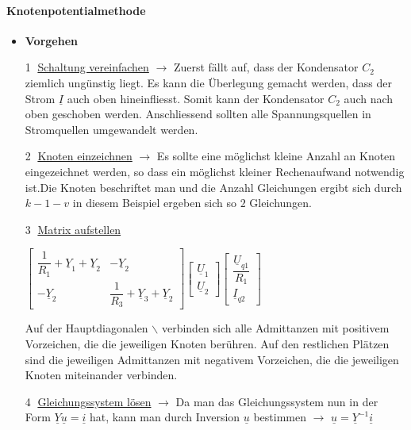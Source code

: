 \newpage

\paragraph{Knotenpotentialmethode}
\begin{minipage}{.1\textwidth}
\end{minipage}
\begin{itemize}
	\item \textbf{Vorgehen}
	\item[\textcircled{1}] \underline{Schaltung vereinfachen} $\rightarrow$ Zuerst fällt auf, dass der Kondensator $C_2$ ziemlich ungünstig liegt. Es kann die Überlegung gemacht werden, dass der Strom $\underline{I}$ auch oben hineinfliesst. Somit kann der Kondensator $C_2$ auch nach oben geschoben werden. Anschliessend sollten alle Spannungsquellen in Stromquellen umgewandelt werden.
	\item[\textcircled{2}] \underline{Knoten einzeichnen} $\rightarrow$ Es sollte eine möglichst kleine Anzahl an Knoten \textcolor{brown}{\textbullet}  eingezeichnet werden, so dass ein möglichst kleiner Rechenaufwand notwendig ist.Die Knoten beschriftet man und die Anzahl Gleichungen ergibt sich durch $k-1-v$ in diesem Beispiel ergeben sich so $2$ Gleichungen.
	\item[\textcircled{3}] \underline{Matrix aufstellen}
	\item[] $\left[\begin{matrix}
	\dfrac{1}{R_1}+\underline{Y}_1+\underline{Y}_2	& -\underline{Y}_2 \\ 
	-\underline{Y}_2	& \dfrac{1}{R_3}+\underline{Y}_3+\underline{Y}_2 
	\end{matrix} \right] \left[\begin{matrix}
	\underline{U}_1\\\underline{U}_2	\end{matrix} \right] \left[\begin{matrix}
	\dfrac{\underline{U}_{q1}}{R_1}\\  \underline{I}_{q2}
	
	\end{matrix} \right]$ 
	\item[] Auf der Hauptdiagonalen $\smallsetminus$ verbinden sich alle Admittanzen mit positivem Vorzeichen, die die jeweiligen Knoten berühren. Auf den restlichen Plätzen sind die jeweiligen Admittanzen mit negativem Vorzeichen, die die jeweiligen Knoten miteinander verbinden.
	\item[\textcircled{4}] \underline{Gleichungssystem lösen} $\rightarrow$ Da man das Gleichungssystem nun in der Form $\underline{Y}\underline{u}=\underline{i}$ hat, kann man durch Inversion $\underline{u}$ bestimmen $\rightarrow$ $\underline{u}=\underline{Y}^{-1}\underline{i}$ 
\end{itemize}
